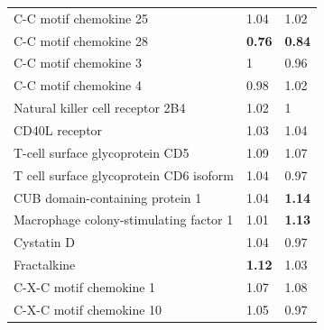 \begin{table}[ht]
\begin{tabular}{lll}
C-C motif chemokine 25                                  & {\color[HTML]{C0C0C0} 1.04}          & {\color[HTML]{C0C0C0} 1.02}          \\
C-C motif chemokine 28                                  & {\color[HTML]{CB0000} \textbf{0.76}} & {\color[HTML]{CB0000} \textbf{0.84}} \\
\rowcolor[HTML]{EFEFEF} 
{\color[HTML]{000000} C-C motif chemokine 3}            & {\color[HTML]{C0C0C0} 1}             & {\color[HTML]{C0C0C0} 0.96}          \\
\rowcolor[HTML]{EFEFEF} 
{\color[HTML]{000000} C-C motif chemokine 4}            & {\color[HTML]{C0C0C0} 0.98}          & {\color[HTML]{C0C0C0} 1.02}          \\
\rowcolor[HTML]{EFEFEF} 
{\color[HTML]{000000} Natural killer cell receptor 2B4} & {\color[HTML]{C0C0C0} 1.02}          & {\color[HTML]{C0C0C0} 1}             \\
\rowcolor[HTML]{EFEFEF} 
{\color[HTML]{000000} CD40L receptor}                   & {\color[HTML]{C0C0C0} 1.03}          & {\color[HTML]{C0C0C0} 1.04}          \\
T-cell surface glycoprotein CD5                         & {\color[HTML]{C0C0C0} 1.09}          & {\color[HTML]{C0C0C0} 1.07}          \\
T cell surface glycoprotein CD6 isoform                 & {\color[HTML]{C0C0C0} 1.04}          & {\color[HTML]{C0C0C0} 0.97}          \\
CUB domain-containing protein 1                         & {\color[HTML]{C0C0C0} 1.04}          & {\color[HTML]{009901} \textbf{1.14}} \\
Macrophage colony-stimulating factor 1                  & {\color[HTML]{C0C0C0} 1.01}          & {\color[HTML]{009901} \textbf{1.13}} \\
\rowcolor[HTML]{EFEFEF} 
Cystatin D                                              & {\color[HTML]{C0C0C0} 1.04}          & {\color[HTML]{C0C0C0} 0.97}          \\
\rowcolor[HTML]{EFEFEF} 
Fractalkine                                             & {\color[HTML]{009901} \textbf{1.12}} & {\color[HTML]{C0C0C0} 1.03}          \\
\rowcolor[HTML]{EFEFEF} 
C-X-C motif chemokine 1                                 & {\color[HTML]{C0C0C0} 1.07}          & {\color[HTML]{C0C0C0} 1.08}          \\
\rowcolor[HTML]{EFEFEF} 
C-X-C motif chemokine 10                                & {\color[HTML]{C0C0C0} 1.05}          & {\color[HTML]{C0C0C0} 0.97}         
\end{tabular}

\label{table:Result1Friends1}
\end{table}


